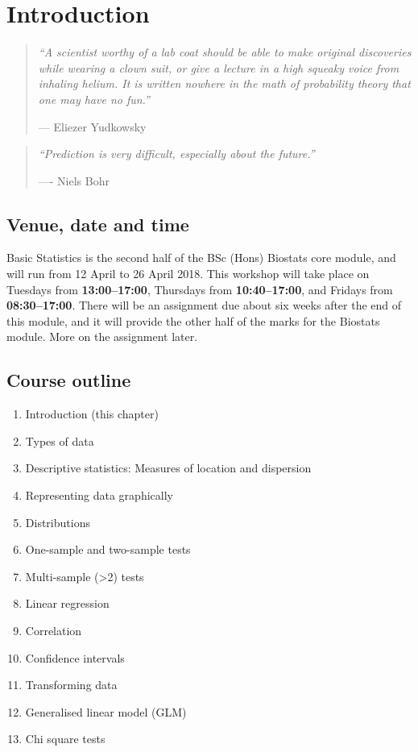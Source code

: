 \documentclass[english,10pt,a4paper,oneside]{book}
\providecommand{\tightlist}{%
  \setlength{\itemsep}{0pt}\setlength{\parskip}{0pt}}
\theoremstyle{definition}
\theoremstyle{definition}
\theoremstyle{definition}
\theoremstyle{remark}
\begin{document}
\chapter{Introduction}\label{introduction}

\begin{quote}
\emph{\enquote{A scientist worthy of a lab coat should be able to make
original discoveries while wearing a clown suit, or give a lecture in a
high squeaky voice from inhaling helium. It is written nowhere in the
math of probability theory that one may have no fun.}}

--- Eliezer Yudkowsky
\end{quote}

\begin{quote}
\emph{\enquote{Prediction is very difficult, especially about the
future.}}

---- Niels Bohr
\end{quote}

\section{Venue, date and time}\label{venue-date-and-time}

Basic Statistics is the second half of the BSc (Hons) Biostats core
module, and will run from 12 April to 26 April 2018. This workshop will
take place on Tuesdays from \textbf{13:00--17:00}, Thursdays from
\textbf{10:40--17:00}, and Fridays from \textbf{08:30--17:00}. There
will be an assignment due about six weeks after the end of this module,
and it will provide the other half of the marks for the Biostats module.
More on the assignment later.

\section{Course outline}\label{course-outline}

\begin{enumerate}
\def\labelenumi{\arabic{enumi}.}
\tightlist
\item
  Introduction (this chapter)
\item
  Types of data
\item
  Descriptive statistics: Measures of location and dispersion
\item
  Representing data graphically
\item
  Distributions
\item
  One-sample and two-sample tests
\item
  Multi-sample (\textgreater{}2) tests
\item
  Linear regression
\item
  Correlation
\item
  Confidence intervals
\item
  Transforming data
\item
  Generalised linear model (GLM)
\item
  Chi square tests
\end{enumerate}
\end{document}
